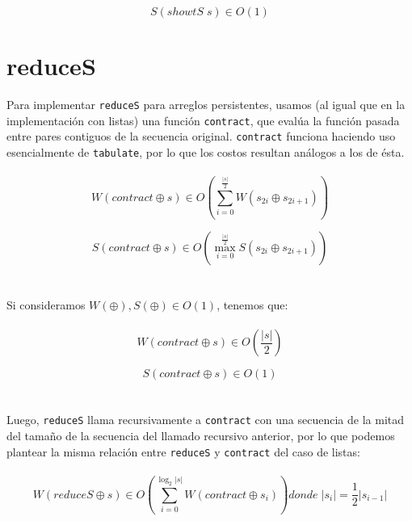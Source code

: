 \documentclass[a4paper,10pt]{article}
\begin{document}
		\begin{equation*}
			S\left( showtS \; s \right) \in O\left( 1 \right)
		\end{equation*}	

\pagebreak
	\section*{\Large reduceS}
		Para implementar \texttt{reduceS} para arreglos persistentes, usamos (al igual que en la implementación con listas) una función \texttt{contract}, que evalúa la función pasada entre pares contiguos de la secuencia original. \texttt{contract} funciona haciendo uso esencialmente de \texttt{tabulate}, por lo que los costos resultan análogos a los de ésta.
\\
\\
		\begin{equation*}
			W \left( contract \oplus  s \right) \in O \left( \sum_{i=0}^{\frac{\vert s \vert}{2}} W \left( s_{2i} \oplus s_{2i+1} \right) \right)
		\end{equation*}

		\begin{equation*}
		S \left( contract \oplus s \right) \in O \left( \max_{i=0}^{\frac{\vert s \vert}{2}} S \left( s_{2i} \oplus s_{2i+1} \right) \right)
		\end{equation*}
\\
\\
		Si consideramos $W(\oplus), S(\oplus) \in O(1)$, tenemos que:
\\
\\		
		\begin{equation*}
			W \left( contract \oplus s \right) \in O \left( \frac{\vert s \vert}{2} \right)
		\end{equation*}
		
		\begin{equation*}
			S \left( contract \oplus s \right) \in O \left( 1 \right)
		\end{equation*}
\\
\\	
		Luego, \texttt{reduceS} llama recursivamente a \texttt{contract} con una secuencia de la mitad del tamaño de la secuencia del llamado recursivo anterior, por lo que podemos plantear la misma relación entre \texttt{reduceS} y \texttt{contract} del caso de listas:
\\
\\	
	\begin{equation*}
		W \left( reduceS \oplus s \right) \in O \left(\sum_{i=0}^{\log_2 \vert s \vert} W \left( contract \oplus s_i \right) \right) donde \; \vert s_i\vert = \frac{1}{2} \vert s_{i-1} \vert
	\end{equation*}
\end{document}
